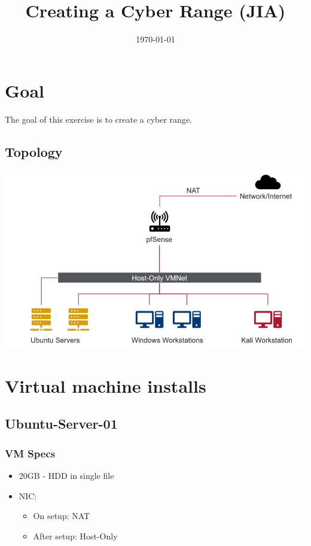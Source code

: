 \documentclass[11pt]{article}
\date{\today}
\title{Creating a Cyber Range (JIA)}
\begin{document}
\maketitle
\tableofcontents

\section{Goal}
\label{sec:org0dacc84}
The goal of this exercise is to create a cyber range.
\subsection{Topology}
\label{sec:org410d5ba}
\begin{center}
\includegraphics[width=.9\linewidth]{./img/topology.png}
\end{center}
\section{Virtual machine installs}
\label{sec:org725aadd}
\subsection{Ubuntu-Server-01}
\label{sec:org7da871f}
\subsubsection{VM Specs}
\label{sec:org3629aaf}
\begin{itemize}
\item 20GB - HDD in single file
\item NIC:
\begin{itemize}
\item On setup: NAT
\item After setup: Host-Only
\end{itemize}
\end{itemize}
\end{document}
